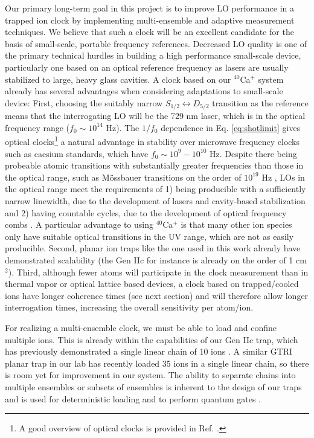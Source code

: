 Our primary long-term goal in this project is to improve LO performance in a trapped ion clock by implementing multi-ensemble and adaptive measurement techniques. We believe that such a clock will be an excellent candidate for the basis of small-scale, portable frequency references. Decreased LO quality is one of the primary technical hurdles in building a high performance small-scale device, particularly one based on an optical reference frequency as lasers are usually stabilized to large, heavy glass cavities. A clock based on our $^{40}$Ca$^+$ system already has several advantages when considering adaptations to small-scale device: First, choosing the suitably narrow $S_{1/2} \leftrightarrow D_{5/2}$ transition as the reference means that the interrogating LO will be the 729 nm laser, which is in the optical frequency range ($f_0 \sim 10^{14}$ Hz). The $1/f_0$ dependence in Eq. \ref{eq:shotlimit} gives optical clocks\footnote{A good overview of optical clocks is provided in Ref. \cite{OpticalClocks}.} a natural advantage in stability over microwave frequency clocks such as caesium standards, which have $f_0 \sim 10^9 - 10^{10}$ Hz. Despite there being probeable atomic transitions with substantially greater frequencies than those in the optical range, such as M\"{o}ssbauer transitions on the order of $10^{19}$ Hz \cite{OpticalClocks}, LOs in the optical range meet the requirements of 1) being producible with a sufficiently narrow linewidth, due to the development of lasers and cavity-based stabilization \cite{StableLaser1, 6174186,McFerran:12,KesslerT.2012,Y.2011,PhysRevA.79.053829,Dubé2009,Ludlow:07, PhysRevLett.82.3799} and 2) having countable cycles, due to the development of optical frequency combs \cite{R.2008,RevModPhys.78.1297,Grosche2008,RevModPhys.78.1279,RevModPhys.75.325,Udem:99, PhysRevLett.88.073601,PhysRevLett.84.5102}. A particular advantage to using $^{40}$Ca$^+$  is that many other ion species only have suitable optical transitions in the UV range, which are not as easily producible. Second, planar ion traps like the one used in this work already have demonstrated scalability (the Gen IIc for instance is already on the order of 1 cm$^2$). Third, although fewer atoms will participate in the clock measurement than in thermal vapor or optical lattice based devices, a clock based on trapped/cooled ions have longer coherence times (see next section) and will therefore allow longer interrogation times, increasing the overall sensitivity per atom/ion. 

For realizing a multi-ensemble clock, we must be able to load and confine multiple ions. This is already within the capabilities of our Gen IIc trap, which has previously demonstrated a single linear chain of 10 ions \cite{IonTrap}. A similar GTRI planar trap in our lab has recently loaded 35 ions in a single linear chain, so there is room yet for improvement in our system. The ability to separate chains into multiple ensembles or subsets of ensembles is inherent to the design of our traps and is used for deterministic loading and to perform quantum gates \cite{Kielpinski2002}. 

